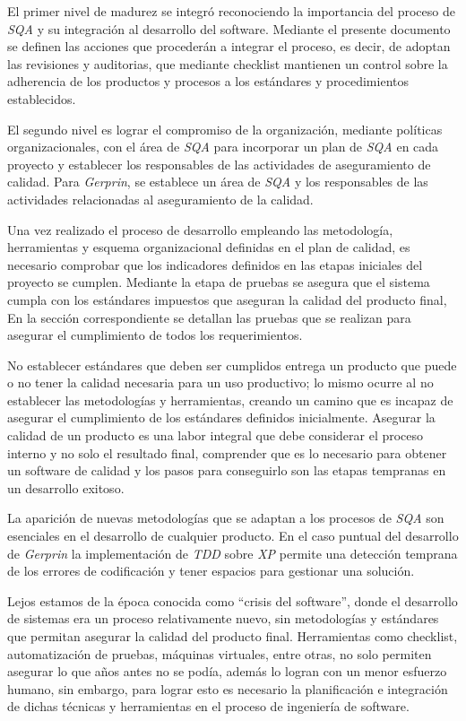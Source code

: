 El primer nivel de madurez se integró reconociendo la importancia del proceso de \textit{SQA} y su integración al desarrollo del software. Mediante el presente documento se definen las acciones que procederán a integrar el proceso, es decir, de adoptan las revisiones y auditorias, que mediante checklist mantienen un control sobre la adherencia de los productos y procesos a los estándares y procedimientos establecidos.

El segundo nivel es lograr el compromiso de la organización, mediante políticas organizacionales, con el área de \textit{SQA} para incorporar un plan de \textit{SQA} en cada proyecto y establecer los responsables de las actividades de aseguramiento de calidad. Para \textit{Gerprin}, se establece un área de \textit{SQA} y los responsables de las actividades relacionadas al aseguramiento de la calidad. 

Una vez realizado el proceso de desarrollo empleando las metodología, herramientas y esquema organizacional definidas en el plan de calidad, es necesario comprobar que los indicadores definidos en las etapas iniciales del proyecto se cumplen. Mediante la etapa de pruebas se asegura que el sistema cumpla con los estándares impuestos que aseguran la calidad del producto final, En la sección correspondiente se detallan las pruebas que se realizan para asegurar el cumplimiento de todos los requerimientos. 

No establecer estándares que deben ser cumplidos entrega un producto que puede o no tener la calidad necesaria para un uso productivo; lo mismo ocurre al no establecer las metodologías y herramientas, creando un camino que es incapaz de asegurar el cumplimiento de los estándares definidos inicialmente. Asegurar la calidad de un producto es una labor integral que debe considerar el proceso interno y no solo el resultado final, comprender que es lo necesario para obtener un software de calidad y los pasos para conseguirlo son las etapas tempranas en un desarrollo exitoso. 

La aparición de nuevas metodologías que se adaptan a los procesos de \textit{SQA} son esenciales en el desarrollo de cualquier producto. En el caso puntual del desarrollo de \textit{Gerprin} la implementación de \textit{TDD} sobre \textit{XP} permite una detección temprana de los errores de codificación y tener espacios para gestionar una solución. 

Lejos estamos de la época conocida como “crisis del software”, donde el desarrollo de sistemas era un proceso relativamente nuevo, sin metodologías y estándares que permitan asegurar la calidad del producto final. Herramientas como checklist, automatización de pruebas, máquinas virtuales, entre otras, no solo permiten asegurar lo que años antes no se podía, además lo logran con un menor esfuerzo humano, sin embargo, para lograr esto es necesario la planificación e integración de dichas técnicas y herramientas en el proceso de ingeniería de software. 

